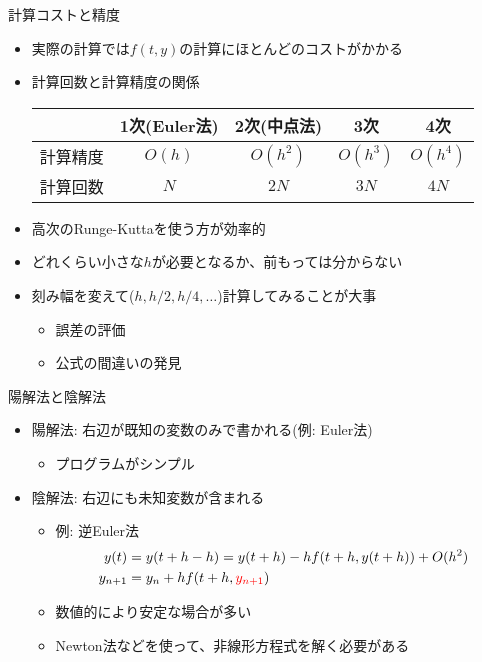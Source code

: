 \documentclass[dvipdfmx]{beamer}
\begin{document}
\begin{frame}[t,fragile]{計算コストと精度}
  \begin{itemize}
    \setlength{\itemsep}{1em}
  \item 実際の計算では$f(t,y)$の計算にほとんどのコストがかかる
  \item 計算回数と計算精度の関係
    \begin{center}
      \begin{tabular}[h]{c|cccc}
        & 1次(Euler法) & 2次(中点法) & 3次 & 4次 \\
        \hline
        計算精度 & $O(h)$ & $O(h^2)$ & $O(h^3)$ & $O(h^4)$ \\
        計算回数 & $N$ & $2N$ & $3N$ & $4N$
      \end{tabular}
    \end{center}
  \item 高次のRunge-Kuttaを使う方が効率的
  \item どれくらい小さな$h$が必要となるか、前もっては分からない
  \item 刻み幅を変えて($h,h/2,h/4,\dots$)計算してみることが大事
    \begin{itemize}
    \item 誤差の評価
    \item 公式の間違いの発見
    \end{itemize}
  \end{itemize}
\end{frame}

\begin{frame}[t,fragile]{陽解法と陰解法}
  \begin{itemize}
    \setlength{\itemsep}{1em}
  \item 陽解法: 右辺が既知の変数のみで書かれる(例: Euler法)
    \begin{itemize}
    \item プログラムがシンプル
    \end{itemize}
  \item 陰解法: 右辺にも未知変数が含まれる
    \begin{itemize}
    \item 例: 逆Euler法
      \begin{align*}
        y(t) &= y(t+h-h) = y(t+h) - h f(t+h,y(t+h)) + O(h^2) \\
        y_{n+1} &= y_n + h f(t+h,{\color{red}y_{n+1}})
      \end{align*}
    \item 数値的により安定な場合が多い
    \item Newton法などを使って、非線形方程式を解く必要がある
    \end{itemize}
  \end{itemize}
\end{frame}
\end{document}
